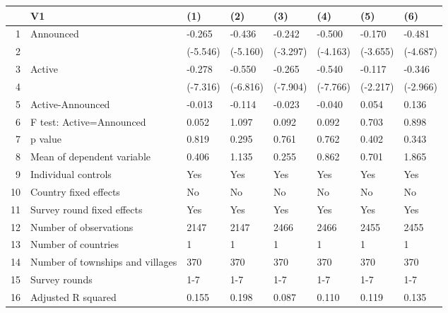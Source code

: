 \begin{table}[ht]
\centering
\begin{tabular}{rlllllll}
  \hline
 & V1 & (1) & (2) & (3) & (4) & (5) & (6) \\ 
  \hline
1 & Announced & -0.265 & -0.436 & -0.242 & -0.500 & -0.170 & -0.481 \\ 
  2 &  & (-5.546) & (-5.160) & (-3.297) & (-4.163) & (-3.655) & (-4.687) \\ 
  3 & Active & -0.278 & -0.550 & -0.265 & -0.540 & -0.117 & -0.346 \\ 
  4 &  & (-7.316) & (-6.816) & (-7.904) & (-7.766) & (-2.217) & (-2.966) \\ 
  5 & Active-Announced & -0.013 & -0.114 & -0.023 & -0.040 & 0.054 & 0.136 \\ 
  6 & F test: Active=Announced & 0.052 & 1.097 & 0.092 & 0.092 & 0.703 & 0.898 \\ 
  7 & p value & 0.819 & 0.295 & 0.761 & 0.762 & 0.402 & 0.343 \\ 
  8 & Mean of dependent variable & 0.406 & 1.135 & 0.255 & 0.862 & 0.701 & 1.865 \\ 
  9 & Individual controls & Yes & Yes & Yes & Yes & Yes & Yes \\ 
  10 & Country fixed effects & No & No & No & No & No & No \\ 
  11 & Survey round fixed effects & Yes & Yes & Yes & Yes & Yes & Yes \\ 
  12 & Number of observations & 2147 & 2147 & 2466 & 2466 & 2455 & 2455 \\ 
  13 & Number of countries & 1 & 1 & 1 & 1 & 1 & 1 \\ 
  14 & Number of townships and villages & 370 & 370 & 370 & 370 & 370 & 370 \\ 
  15 & Survey rounds & 1-7 & 1-7 & 1-7 & 1-7 & 1-7 & 1-7 \\ 
  16 & Adjusted R squared & 0.155 & 0.198 & 0.087 & 0.110 & 0.119 & 0.135 \\ 
   \hline
\end{tabular}
\end{table}
